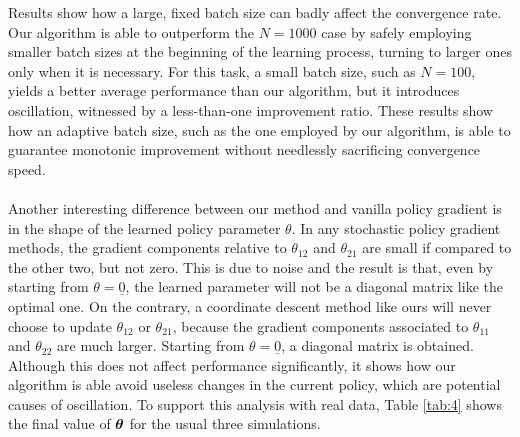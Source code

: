 Results show how a large, fixed batch size can badly affect the convergence rate. Our algorithm is able to outperform the $N=1000$ case by safely employing smaller batch sizes at the beginning of the learning process, turning to larger ones only when it is necessary.
For this task, a small batch size, such as $N=100$, yields a better average performance than our algorithm, but it introduces oscillation, witnessed by a less-than-one improvement ratio.
These results show how an adaptive batch size, such as the one employed by our algorithm, is able to guarantee monotonic improvement without needlessly sacrificing convergence speed.
\paragraph{}
Another interesting difference between our method and vanilla policy gradient is in the shape of the learned policy parameter $\theta$. In any stochastic policy gradient methods, the gradient components relative to $\theta_{12}$ and $\theta_{21}$ are small if compared to the other two, but not zero. This is due to noise and the result is that, even by starting from $\theta = \underline{0}$, the learned parameter will not be a diagonal matrix like the optimal one. On the contrary, a coordinate descent method like ours will never choose to update $\theta_{12}$ or $\theta_{21}$, because the gradient components associated to $\theta_{11}$ and $\theta_{22}$ are much larger. Starting from $\theta = \underline{0}$, a diagonal matrix is obtained.
Although this does not affect performance significantly, it shows how our algorithm is able avoid useless changes in the current policy, which are potential causes of oscillation. To support this analysis with real data, Table \ref{tab:4} shows the final value of $\boldsymbol{\theta}$ for the usual three simulations.

